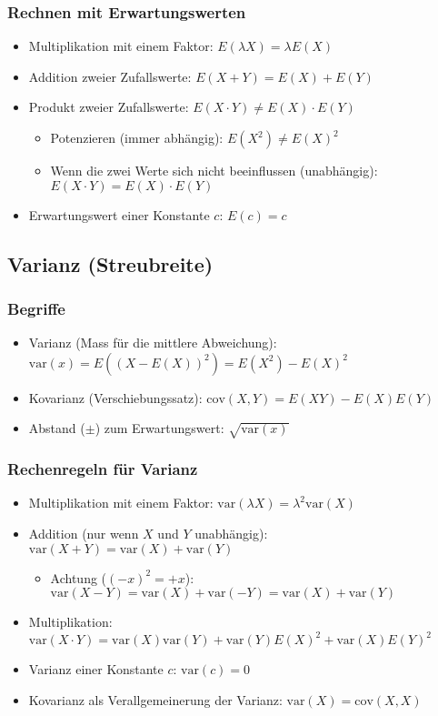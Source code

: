 \subsubsection{Rechnen mit Erwartungswerten}
\begin{itemize}
  \item Multiplikation mit einem Faktor: $E(\lambda X) = \lambda E(X)$
  \item Addition zweier Zufallswerte: $E(X + Y) = E(X) + E(Y)$
  \item Produkt zweier Zufallswerte: $E(X \cdot Y) \ne E(X) \cdot E(Y)$
  \begin{itemize}
    \item Potenzieren (immer abhängig): $E(X^2) \ne E(X)^2$
    \item Wenn die zwei Werte sich nicht beeinflussen
      (unabhängig): $E(X \cdot Y) = E(X) \cdot E(Y)$
  \end{itemize}
  \item Erwartungswert einer Konstante $c$: $E(c) = c$
\end{itemize}

\subsection{Varianz (Streubreite)}
\subsubsection{Begriffe}
\begin{itemize}
  \item Varianz (Mass für die mittlere Abweichung):
    $\text{var}(x) = E((X - E(X))^2) = E(X^2) - E(X)^2$
  \item Kovarianz (Verschiebungssatz):
    $\text{cov}(X,Y) = E(XY) - E(X)E(Y)$
  \item Abstand ($\pm$) zum Erwartungswert: $\sqrt{\text{var}(x)}$
\end{itemize}
\subsubsection{Rechenregeln für Varianz}
\begin{itemize}
  \item Multiplikation mit einem Faktor:
    $\text{var}(\lambda X) = \lambda^2 \text{var}(X)$
  \item Addition (nur wenn $X$ und $Y$ unabhängig):
    $\text{var}(X+Y) = \text{var}(X) + \text{var}(Y)$
    \begin{itemize}
      \item Achtung ($(-x)^2 = +x$): $\text{var}(X-Y) = \text{var}(X)
        + \text{var}(-Y) = \text{var}(X) + \text{var}(Y)$
    \end{itemize}
  \item Multiplikation: $\text{var}(X \cdot Y) = \text{var}(X)
    \text{var}(Y) + \text{var}(Y)E(X)^2 + \text{var}(X)E(Y)^2$
  \item Varianz einer Konstante $c$: $\text{var}(c) = 0$
  \item Kovarianz als Verallgemeinerung der Varianz:
    $\text{var}(X) = \text{cov}(X,X)$
\end{itemize}

